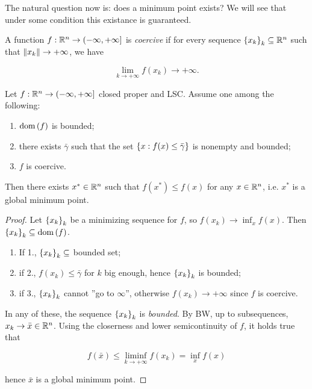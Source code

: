 The natural question now is: does a minimum point exists? We will see that under some condition this existance is guaranteed.

\begin{definition}[Coercivity]

    A function $f : {\mathbb{R}^n} \to (-\infty,+\infty]$ is \emph{coercive} if for every sequence $\left\{ x_k \right\}_k \subseteq {\mathbb{R}^n}$ such that $\lVert x_k \rVert \to +\infty$, we have 
    
    \[ \lim_{k \to +\infty} f(x_k )\to +\infty. \]
    
\end{definition}

\begin{proposition}

    Let $f : {\mathbb{R}^n} \to (-\infty,+\infty]$ closed proper and LSC. Assume one among the following:

    \begin{enumerate}
        \item $\mathrm{dom}\left(f\right)$ is bounded;
        \item there exists $\bar{\gamma}$ such that the set $\left\{ x : f(x) \le \bar{\gamma} \right\}$ is nonempty and bounded;
        \item $f$ is coercive.
    \end{enumerate}

    Then there exists $x^* \in {\mathbb{R}^n}$ such that $f(x^*) \le f(x)$ for any $x \in {\mathbb{R}^n}$, i.e. $x^*$ is a global minimum point.
    
\end{proposition}

\begin{proof}
    
    Let $\left\{ x_k \right\}_k$ be a minimizing sequence for $f$, so $f(x_k) \to \inf_x f(x)$. Then $\left\{ x_k \right\}_k \subseteq \mathrm{dom}\left(f\right)$. 

    \begin{enumerate}
        \item If 1., $\left\{ x_k \right\}_k \subseteq$ bounded set;
        \item if 2., $f(x_k) \le \bar{\gamma}$ for $k$ big enough, hence $\left\{ x_k \right\}_k$ is bounded;
        \item if 3., $\left\{ x_k \right\}_k$ cannot ''go to $\infty$'', otherwise $f(x_k) \to +\infty$ since $f$ is coercive.
    \end{enumerate}

    In any of these, the sequence $\left\{ x_k \right\}_k$ is \emph{bounded}. By BW, up to subsequences, $x_k \to \bar{x} \in {\mathbb{R}^n}$. Using the closerness and lower semicontinuity of $f$, it holds true that 

    \[ f(\bar{x}) \le \liminf_{k \to +\infty} f(x_k) = \inf_x f(x)\]

    hence $\bar{x}$ is a global minimum point.

\end{proof}

